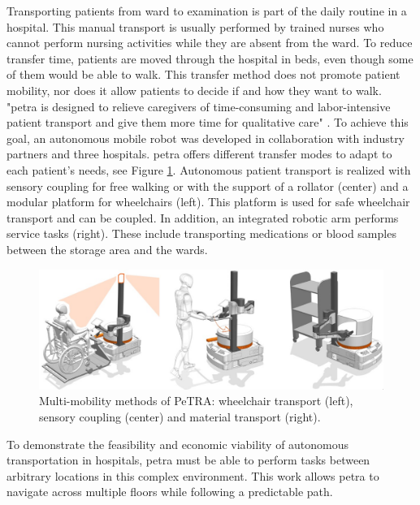 Transporting patients from ward to examination is part of the daily routine in a hospital. This manual transport is usually performed by trained nurses who cannot perform nursing activities while they are absent from the ward. To reduce transfer time, patients are moved through the hospital in beds, even though some of them would be able to walk. This transfer method does not promote patient mobility, nor does it allow patients to decide if and how they want to walk. "\Gls{petra} is designed to relieve caregivers of time-consuming and labor-intensive patient transport and give them more time for qualitative care" \cite{petra-konsortium_personen-transfer_2022}. To achieve this goal, an autonomous mobile robot was developed in collaboration with industry partners and three hospitals. \Gls{petra} offers different transfer modes to adapt to each patient's needs, see Figure \ref{fig:multi_mobility_methods}. Autonomous patient transport is realized with sensory coupling for free walking or with the support of a rollator (center) and a modular platform for wheelchairs (left). This platform is used for safe wheelchair transport and can be coupled. In addition, an integrated robotic arm performs service tasks (right). These include transporting medications or blood samples between the storage area and the wards.

\begin{figure}[h]
    \centering
    \includegraphics[width=\textwidth]{figures/10_introduction/PeTRA_transport_modes.jpg}
    \caption[Multi-mobility methods of PeTRA]{Multi-mobility methods of PeTRA: wheelchair transport (left), sensory coupling (center) and material transport (right).}
    \label{fig:multi_mobility_methods}
\end{figure}

To demonstrate the feasibility and economic viability of autonomous transportation in hospitals, \gls{petra} must be able to perform tasks between arbitrary locations in this complex environment. This work allows \gls{petra} to navigate across multiple floors while following a predictable path.

